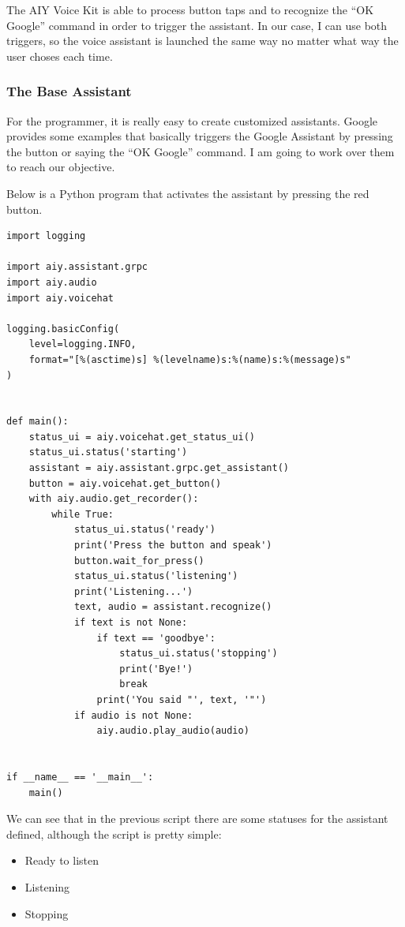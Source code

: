 The AIY Voice Kit is able to process button taps and to recognize the “OK Google” command in order to trigger the assistant. In 
our case, I can use both triggers, so the voice assistant is launched the same way no matter what way the user choses each time. 

\subsubsection{The Base Assistant}
For the programmer, it is really easy to create customized assistants. Google provides some examples that basically triggers the 
Google Assistant by pressing the button or saying the “OK Google” command. I am going to work over them to reach our objective.

Below is a Python program that activates the assistant by pressing the red button.

\begin{lstlisting}[style=PythonCode]
import logging

import aiy.assistant.grpc
import aiy.audio
import aiy.voicehat

logging.basicConfig(
    level=logging.INFO,
    format="[%(asctime)s] %(levelname)s:%(name)s:%(message)s"
)


def main():
	status_ui = aiy.voicehat.get_status_ui()
	status_ui.status('starting')
	assistant = aiy.assistant.grpc.get_assistant()
	button = aiy.voicehat.get_button()
	with aiy.audio.get_recorder():
        while True:
            status_ui.status('ready')
            print('Press the button and speak')
            button.wait_for_press()
            status_ui.status('listening')
            print('Listening...')
            text, audio = assistant.recognize()
            if text is not None:
                if text == 'goodbye':
                    status_ui.status('stopping')
                    print('Bye!')
                    break
                print('You said "', text, '"')
            if audio is not None:
                aiy.audio.play_audio(audio)


if __name__ == '__main__':
    main()
\end{lstlisting}

We can see that in the previous script there are some statuses for the assistant defined, although the script is pretty simple:
\begin{itemize}
    \item Ready to listen
    \item Listening
    \item Stopping
\end{itemize}

